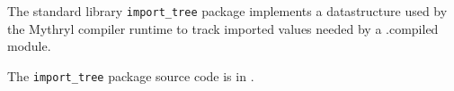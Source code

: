 
The standard library {\tt import\_tree} package implements a datastructure used by the Mythryl compiler runtime to track imported values needed by a .compiled module.

The {\tt import\_tree} package source code is in .



